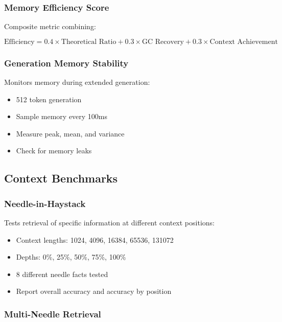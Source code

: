 \subsubsection{Memory Efficiency Score}

Composite metric combining:

\begin{equation}
\text{Efficiency} = 0.4 \times \text{Theoretical Ratio} + 0.3 \times \text{GC Recovery} + 0.3 \times \text{Context Achievement}
\end{equation}

\subsubsection{Generation Memory Stability}

Monitors memory during extended generation:

\begin{itemize}
    \item 512 token generation
    \item Sample memory every 100ms
    \item Measure peak, mean, and variance
    \item Check for memory leaks
\end{itemize}

\subsection{Context Benchmarks}

\subsubsection{Needle-in-Haystack}

Tests retrieval of specific information at different context positions:

\begin{itemize}
    \item Context lengths: 1024, 4096, 16384, 65536, 131072
    \item Depths: 0\%, 25\%, 50\%, 75\%, 100\%
    \item 8 different needle facts tested
    \item Report overall accuracy and accuracy by position
\end{itemize}

\subsubsection{Multi-Needle Retrieval}

